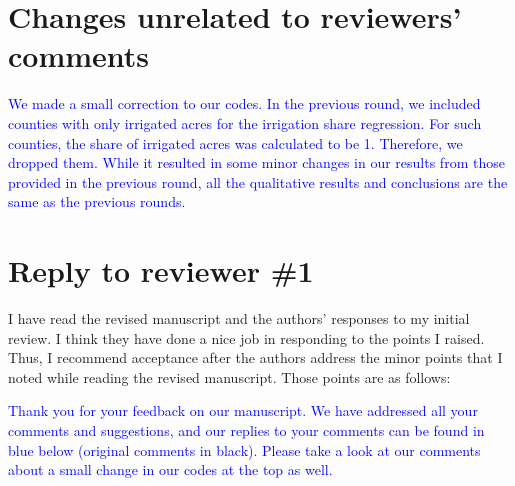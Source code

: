 \documentclass[
]{article}
\author{}
\date{\vspace{-2.5em}}
\begin{document}
\section{Changes unrelated to reviewers' comments}

\textcolor{blue}{We made a small correction to our codes. In the previous round, we included counties with only irrigated acres for the irrigation share regression. For such counties, the share of irrigated acres was calculated to be 1. Therefore, we dropped them. While it resulted in some minor changes in our results from those provided in the previous round, all the qualitative results and conclusions are the same as the previous rounds.}

\section{Reply to reviewer \#1}

I have read the revised manuscript and the authors’ responses to my initial review. I think they have done a nice job in responding to the points I raised. Thus, I recommend acceptance after the authors address the minor points that I noted while reading the revised manuscript. Those points are as follows:

\textcolor{blue}{Thank you for your feedback on our manuscript. We have addressed all your comments and suggestions, and our replies to your comments can be found in blue below (original comments in black). Please take a look at our comments about a small change in our codes at the top as well.}
\end{document}
